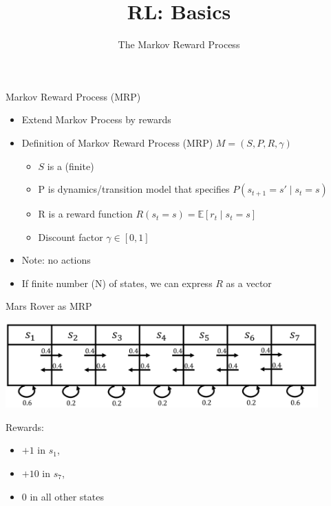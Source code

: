 \documentclass[aspectratio=169]{../latex_main/tntbeamer}  %
\title[Reinforcement Learning: Basics]{RL: Basics}
\subtitle{The Markov Reward Process}
\begin{document}
	
	\maketitle

\begin{frame}[c]{Markov Reward Process (MRP)}

\begin{itemize}
	\item Extend Markov Process by rewards
	\item Definition of Markov Reward Process (MRP) $M =(S, P, R, \gamma)$
	\begin{itemize}
		\item $S$ is a (finite)
		\item P is dynamics/transition model that specifies $P(s_{t+1}=s' \mid s_t = s)$
		\item R is a reward function $R(s_t = s) = \mathbb{E}[r_t \mid s_t = s]$
		\item Discount factor $\gamma \in [0,1]$
	\end{itemize}
	\item Note: no actions
	\item If finite number (N) of states, we can express $R$ as a vector
\end{itemize}

\end{frame}
\begin{frame}[c]{Mars Rover as MRP}
	
\begin{center}
	\includegraphics[width=0.9\textwidth]{images/mars_rover_markov_process_2.png}
\end{center}

Rewards:
\begin{itemize}
	\item $+1$ in $s_1$, 
	\item $+10$ in $s_7$,
	\item $0$ in all other states
\end{itemize}
	
\end{frame}
\end{document}
